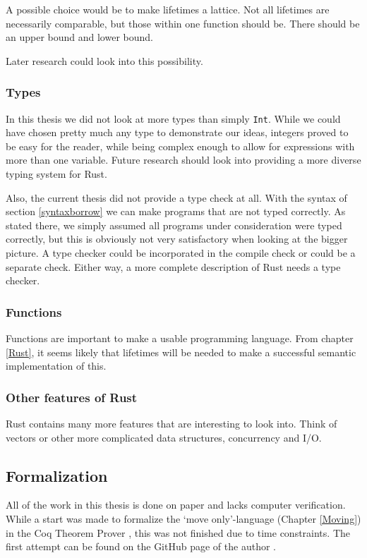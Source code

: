 A possible choice would be to make lifetimes a lattice. Not all lifetimes are necessarily comparable, but those within one function should be. There should be an upper bound and lower bound. 

Later research could look into this possibility. 

\subsubsection*{Types}
In this thesis we did not look at more types than simply \texttt{Int}. While we could have chosen pretty much any type to demonstrate our ideas, integers proved to be easy for the reader, while being complex enough to allow for expressions with more than one variable. Future research should look into providing a more diverse typing system for Rust.

Also, the current thesis did not provide a type check at all. With the syntax of section \ref{syntaxborrow} we can make programs that are not typed correctly. As stated there, we simply assumed all programs under consideration were typed correctly, but this is obviously not very satisfactory when looking at the bigger picture. A type checker could be incorporated in the compile check or could be a separate check. Either way, a more complete description of Rust needs a type checker. 

\subsubsection*{Functions}
Functions are important to make a usable programming language. From chapter \ref{Rust}, it seems likely that lifetimes will be needed to make a successful semantic implementation of this. 

\subsubsection*{Other features of Rust}
Rust contains many more features that are interesting to look into. Think of vectors or other more complicated data structures, concurrency and I/O. 

\subsection{Formalization}
All of the work in this thesis is done on paper and lacks computer verification. While a start was made to formalize the `move only'-language (Chapter \ref{Moving}) in the Coq Theorem Prover \citep{barras1997coq}, this was not finished due to time constraints. The first attempt can be found on the GitHub page of the author \citep{github}. 

